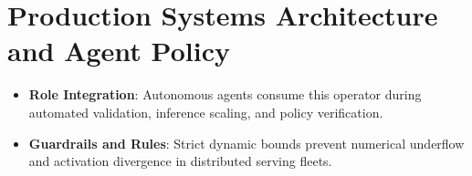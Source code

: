 \documentclass[11pt,a4paper]{article}
\theoremstyle{definition}
\begin{document}
\section{Production Systems Architecture and Agent Policy}
\begin{itemize}
\item \textbf{Role Integration}: Autonomous agents consume this operator during automated validation, inference scaling, and policy verification.
\item \textbf{Guardrails and Rules}: Strict dynamic bounds prevent numerical underflow and activation divergence in distributed serving fleets.
\end{itemize}
\end{document}
